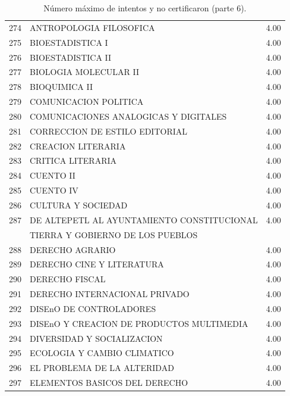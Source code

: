 \documentclass[12pt]{article}
\begin{document}
\begin{table}[ht]
{\begin{tabular}{rlr}
  274 & ANTROPOLOGIA FILOSOFICA & 4.00 \\ 
  275 & BIOESTADISTICA I & 4.00 \\ 
  276 & BIOESTADISTICA II & 4.00 \\ 
  277 & BIOLOGIA MOLECULAR II & 4.00 \\ 
  278 & BIOQUIMICA II & 4.00 \\ 
  279 & COMUNICACION POLITICA & 4.00 \\ 
  280 & COMUNICACIONES ANALOGICAS Y DIGITALES & 4.00 \\ 
  281 & CORRECCION DE ESTILO EDITORIAL & 4.00 \\ 
  282 & CREACION LITERARIA & 4.00 \\ 
  283 & CRITICA LITERARIA & 4.00 \\ 
  284 & CUENTO II & 4.00 \\ 
  285 & CUENTO IV & 4.00 \\ 
  286 & CULTURA Y SOCIEDAD & 4.00 \\ 
  287 & DE ALTEPETL AL AYUNTAMIENTO CONSTITUCIONAL & 4.00 \\ 
   &  TIERRA Y GOBIERNO DE LOS PUEBLOS &  \\ 
  288 & DERECHO AGRARIO & 4.00 \\ 
  289 & DERECHO CINE Y LITERATURA & 4.00 \\ 
  290 & DERECHO FISCAL & 4.00 \\ 
  291 & DERECHO INTERNACIONAL PRIVADO & 4.00 \\ 
  292 & DISEnO DE CONTROLADORES & 4.00 \\ 
  293 & DISEnO Y CREACION DE PRODUCTOS MULTIMEDIA & 4.00 \\ 
  294 & DIVERSIDAD Y SOCIALIZACION & 4.00 \\ 
  295 & ECOLOGIA Y CAMBIO CLIMATICO & 4.00 \\ 
  296 & EL PROBLEMA DE LA ALTERIDAD & 4.00 \\ 
  297 & ELEMENTOS BASICOS DEL DERECHO & 4.00 \\ 
   \hline
\end{tabular}
}\caption{\label{Num_Max_Intentos_Nunca_Cert_6} N\'umero m\'aximo de intentos y no certificaron (parte 6).}

\end{table}
\end{document}

